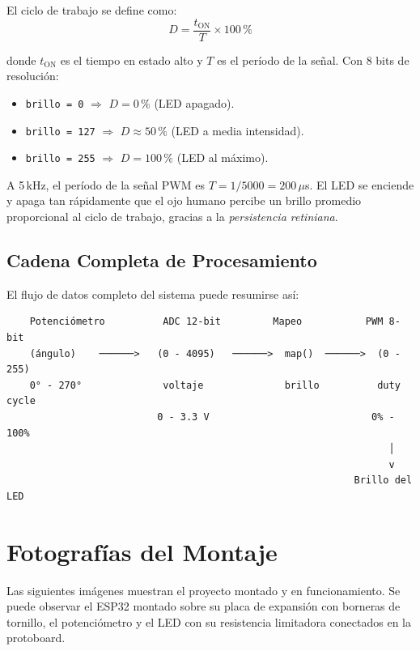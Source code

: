 \documentclass[12pt,a4paper]{article}
\begin{document}
El ciclo de trabajo se define como:
\begin{equation}
D = \frac{t_{\text{ON}}}{T} \times 100\,\%
\label{eq:duty}
\end{equation}

donde $t_{\text{ON}}$ es el tiempo en estado alto y $T$ es el período de la señal. Con 8 bits de resolución:

\begin{itemize}
    \item \texttt{brillo = 0} $\Rightarrow$ $D = 0\,\%$ (LED apagado).
    \item \texttt{brillo = 127} $\Rightarrow$ $D \approx 50\,\%$ (LED a media intensidad).
    \item \texttt{brillo = 255} $\Rightarrow$ $D = 100\,\%$ (LED al máximo).
\end{itemize}

A 5\,kHz, el período de la señal PWM es $T = 1/5000 = 200\,\mu$s. El LED se enciende y apaga tan rápidamente que el ojo humano percibe un brillo promedio proporcional al ciclo de trabajo, gracias a la \textit{persistencia retiniana}.

\subsection{Cadena Completa de Procesamiento}

El flujo de datos completo del sistema puede resumirse así:

\begin{verbatim}
    Potenciómetro          ADC 12-bit         Mapeo           PWM 8-bit
    (ángulo)    ──────>   (0 - 4095)   ──────>  map()  ──────>  (0 - 255)
    0° - 270°              voltaje              brillo          duty cycle
                          0 - 3.3 V                            0% - 100%
                                                                  │
                                                                  v
                                                            Brillo del LED
\end{verbatim}

\section{Fotografías del Montaje}

Las siguientes imágenes muestran el proyecto montado y en funcionamiento. Se puede observar el ESP32 montado sobre su placa de expansión con borneras de tornillo, el potenciómetro y el LED con su resistencia limitadora conectados en la protoboard.
\end{document}
